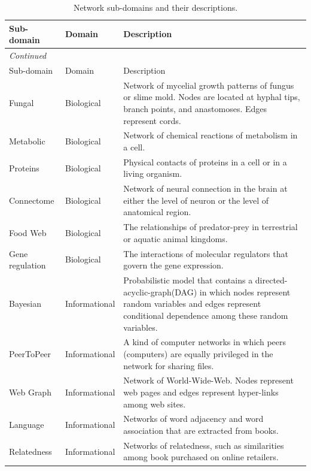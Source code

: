 \documentclass[..]{revtex4}
\begin{document}
\newpage
	\begin{longtable}{| l | l | p{9cm} |}
	\caption{Network sub-domains and their descriptions.} \label{tab:subdomain}\\
	
	\hline
 	Sub-domain & Domain& Description \\ \hline \hline
	 \endfirsthead
	 \multicolumn{3}{l}{\small\it Continued}\\ \hline
	 Sub-domain & Domain& Description \\ \hline \hline
 	\endhead
      Fungal &  Biological & Network of mycelial growth patterns of fungus or slime mold. Nodes are located at hyphal tips, branch points, and anastomoses. Edges represent cords.\\  %
      Metabolic &  Biological & Network of chemical reactions of metabolism in a cell.\\  %
      Proteins &  Biological & Physical contacts of proteins in a cell or in a living organism.\\  %
      Connectome &  Biological & Network of neural connection in the brain at either the level of neuron or the level of anatomical region.\\  %
      Food Web &  Biological & The relationships of predator-prey in terrestrial or aquatic animal kingdoms.\\  %
      Gene regulation &  Biological & The interactions of molecular regulators that govern the gene expression.\\ %
      Bayesian & Informational & Probabilistic model that contains a directed-acyclic-graph(DAG) in which nodes represent random variables and edges represent conditional dependence among these random variables.\\  %
      PeerToPeer &  Informational & A kind of computer networks in which peers (computers) are equally privileged in the network for sharing files.\\ %
      Web Graph &  Informational & Network of World-Wide-Web. Nodes represent web pages and edges represent hyper-links among web sites. \\  %
      Language &  Informational & Networks of word adjacency and word association that are extracted from books.\\  %
      Relatedness &  Informational & Networks of relatedness, such as similarities among book purchased on online retailers. \\ %

\end{longtable}
\end{document}
